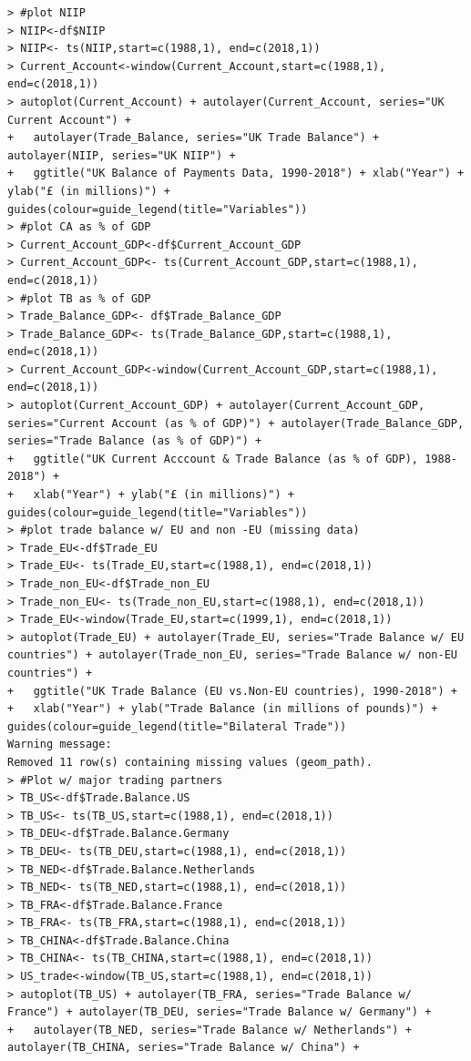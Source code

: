 \documentclass[12pt]{article}
\begin{document}
\begin{verbatim}
> #plot NIIP
> NIIP<-df$NIIP
> NIIP<- ts(NIIP,start=c(1988,1), end=c(2018,1))
> Current_Account<-window(Current_Account,start=c(1988,1), end=c(2018,1)) 
> autoplot(Current_Account) + autolayer(Current_Account, series="UK Current Account") + 
+   autolayer(Trade_Balance, series="UK Trade Balance") + autolayer(NIIP, series="UK NIIP") + 
+   ggtitle("UK Balance of Payments Data, 1990-2018") + xlab("Year") + ylab("£ (in millions)") + guides(colour=guide_legend(title="Variables"))
> #plot CA as % of GDP
> Current_Account_GDP<-df$Current_Account_GDP
> Current_Account_GDP<- ts(Current_Account_GDP,start=c(1988,1), end=c(2018,1))
> #plot TB as % of GDP
> Trade_Balance_GDP<- df$Trade_Balance_GDP
> Trade_Balance_GDP<- ts(Trade_Balance_GDP,start=c(1988,1), end=c(2018,1))
> Current_Account_GDP<-window(Current_Account_GDP,start=c(1988,1), end=c(2018,1)) 
> autoplot(Current_Account_GDP) + autolayer(Current_Account_GDP, series="Current Account (as % of GDP)") + autolayer(Trade_Balance_GDP, series="Trade Balance (as % of GDP)") + 
+   ggtitle("UK Current Acccount & Trade Balance (as % of GDP), 1988-2018") + 
+   xlab("Year") + ylab("£ (in millions)") + guides(colour=guide_legend(title="Variables"))
> #plot trade balance w/ EU and non -EU (missing data)
> Trade_EU<-df$Trade_EU
> Trade_EU<- ts(Trade_EU,start=c(1988,1), end=c(2018,1))
> Trade_non_EU<-df$Trade_non_EU
> Trade_non_EU<- ts(Trade_non_EU,start=c(1988,1), end=c(2018,1))
> Trade_EU<-window(Trade_EU,start=c(1999,1), end=c(2018,1)) 
> autoplot(Trade_EU) + autolayer(Trade_EU, series="Trade Balance w/ EU countries") + autolayer(Trade_non_EU, series="Trade Balance w/ non-EU countries") + 
+   ggtitle("UK Trade Balance (EU vs.Non-EU countries), 1990-2018") + 
+   xlab("Year") + ylab("Trade Balance (in millions of pounds)") + guides(colour=guide_legend(title="Bilateral Trade"))
Warning message:
Removed 11 row(s) containing missing values (geom_path). 
> #Plot w/ major trading partners
> TB_US<-df$Trade.Balance.US
> TB_US<- ts(TB_US,start=c(1988,1), end=c(2018,1))
> TB_DEU<-df$Trade.Balance.Germany
> TB_DEU<- ts(TB_DEU,start=c(1988,1), end=c(2018,1))
> TB_NED<-df$Trade.Balance.Netherlands
> TB_NED<- ts(TB_NED,start=c(1988,1), end=c(2018,1))
> TB_FRA<-df$Trade.Balance.France
> TB_FRA<- ts(TB_FRA,start=c(1988,1), end=c(2018,1))
> TB_CHINA<-df$Trade.Balance.China
> TB_CHINA<- ts(TB_CHINA,start=c(1988,1), end=c(2018,1))
> US_trade<-window(TB_US,start=c(1988,1), end=c(2018,1)) 
> autoplot(TB_US) + autolayer(TB_FRA, series="Trade Balance w/ France") + autolayer(TB_DEU, series="Trade Balance w/ Germany") +
+   autolayer(TB_NED, series="Trade Balance w/ Netherlands") + autolayer(TB_CHINA, series="Trade Balance w/ China") + 

\end{verbatim}
\end{document}
